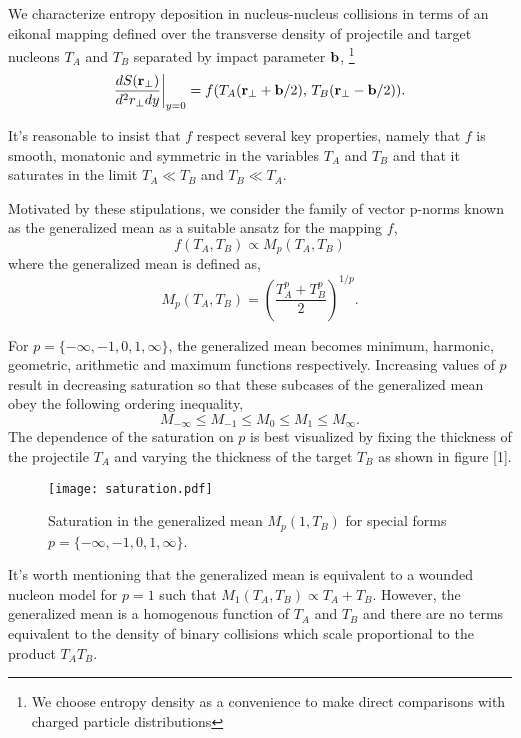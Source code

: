 \documentclass[aps,prl,reprint,amsmath,nofootinbib]{revtex4-1}
\begin{document}
We characterize entropy deposition in nucleus-nucleus collisions in terms of an eikonal mapping defined over the transverse density 
of projectile and target nucleons $T_A$ and $T_B$ separated by impact parameter ${\bf b}$,
\footnote{We choose entropy density as a convenience to make direct comparisons with charged particle distributions}
\begin{equation}
  \frac{dS({\bf r}_\perp)}{d^2r_\perp dy} \biggr \rvert_{y=0}  = f(T_A({\bf r}_\perp + {\bf b}/2),\,T_B({\bf r}_\perp - {\bf b}/2)).
\end{equation}

It's reasonable to insist that $f$ respect several key properties, namely that $f$ is smooth, monatonic and symmetric in 
the variables $T_A$ and $T_B$ and that it saturates in the limit $T_A \ll T_B$ and $T_B \ll T_A$.

Motivated by these stipulations, we consider the family of vector p-norms known as the generalized mean as a suitable ansatz for the mapping $f$,
\begin{equation}
 f(T_A, T_B) \propto M_p(T_A,T_B) 
\end{equation}
where the generalized mean is defined as,
\begin{equation}
 \label{generalized mean}
 M_p(T_A,T_B) = \left( \frac{T_A^p + T_B^p}{2} \right)^{1/p}.
\end{equation}

For $p = \{-\infty,-1,0,1,\infty\}$, the generalized mean becomes minimum, harmonic, geometric, arithmetic and maximum functions respectively. Increasing 
values of $p$ result in decreasing saturation so that these subcases of the generalized mean obey the following ordering inequality, 
\begin{equation}
 M_{-\infty} \le M_{-1} \le M_{0} \le M_{1} \le M_{\infty}.
\end{equation}
The dependence of the saturation on $p$ is best visualized by fixing the thickness of the projectile $T_A$ and varying the thickness of the target $T_B$ as
shown in figure [1].
\begin{figure}[b]
 \texttt{[image: saturation.pdf]}
 \caption{Saturation in the generalized mean $M_p(1,T_B)$ for special forms $p=\{-\infty, -1, 0, 1, \infty\}$.}
\end{figure}

It's worth mentioning that the generalized mean is equivalent to a wounded nucleon model for $p=1$ such that $M_1(T_A,T_B) \propto T_A + T_B$. However, the
generalized mean is a homogenous function of $T_A$ and $T_B$ and there are no terms equivalent to the density of binary collisions which scale proportional
to the product $T_A T_B$.
\end{document}
